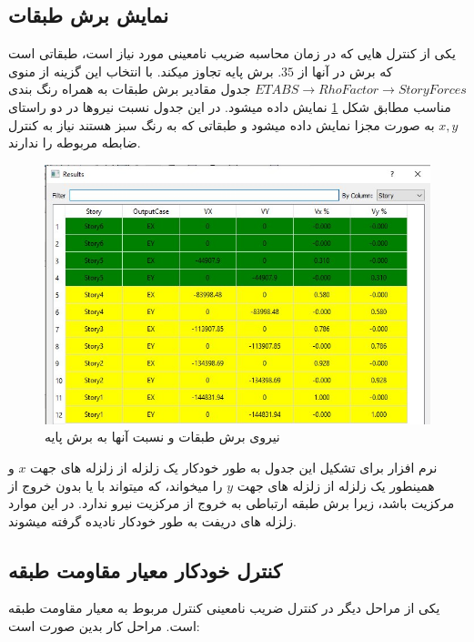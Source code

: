 \subsection{نمایش برش طبقات}
یکی از کنترل هایی که در زمان محاسبه ضریب نامعینی مورد نیاز است، طبقاتی است که برش در آنها از $.35$ 
برش پایه تجاوز میکند. با انتخاب این گزینه از منوی 
$ETABS \rightarrow Rho Factor \rightarrow Story Forces$
جدول مقادیر برش طبقات به همراه رنگ بندی مناسب مطابق شکل 
\ref{pic:story_forces}
نمایش داده میشود. در این جدول نسبت نیروها در دو راستای
$x, y$
به صورت مجزا نمایش داده میشود و طبقاتی که به رنگ سبز هستند نیاز به کنترل ضابطه مربوطه را ندارند.

\begin{figure}[H]
    \centering
    \includegraphics[scale=0.7]{figures/story_forces}
    \caption{نیروی برش طبقات و نسبت آنها به برش پایه}
    \label{pic:story_forces}
\end{figure}

نرم افزار برای تشکیل این جدول به طور خودکار یک زلزله  از زلزله های جهت 
$x$ و 
همینطور یک زلزله  از زلزله های جهت $y$
را میخواند، که میتواند با یا بدون خروج از مرکزیت باشد، زیرا برش طبقه ارتباطی به خروج از مرکزیت نیرو ندارد. در این موارد زلزله های دریفت به طور خودکار نادیده گرفته میشوند.


\subsection{کنترل خودکار معیار مقاومت طبقه}
یکی از مراحل دیگر در کنترل ضریب نامعینی کنترل مربوط به معیار مقاومت طبقه است. مراحل کار بدین صورت است:

